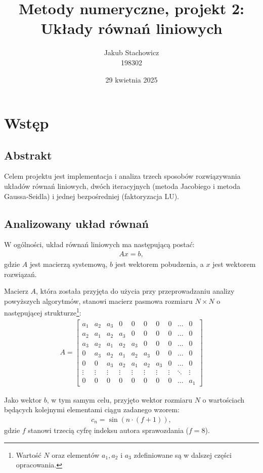 \documentclass{article}
\title{Metody numeryczne, projekt 2:\\Układy równań liniowych}
\author{Jakub Stachowicz\\198302}
\date{29 kwietnia 2025}
\begin{document}
\maketitle
\newpage
\tableofcontents
\newpage
\section{Wstęp}
\subsection{Abstrakt}
Celem projektu jest implementacja i analiza trzech sposobów rozwiązywania układów równań liniowych, dwóch iteracyjnych (metoda Jacobiego i metoda Gaussa-Seidla) i jednej bezpośredniej (faktoryzacja LU).

\subsection{Analizowany układ równań}

W ogólności, układ równań liniowych ma następującą postać:
\begin{align}
       Ax = b,
\end{align}
gdzie $A$ jest macierzą systemową, $b$ jest wektorem pobudzenia, a $x$ jest wektorem rozwiązań.

Macierz $A$, która została przyjęta do użycia przy przeprowadzaniu analizy powyższych algorytmów, stanowi macierz pasmowa rozmiaru $N \times N$ o następującej strukturze\footnote{Wartość $N$ oraz elementów $a_1, a_2$ i $a_3$ zdefiniowane są w dalszej części opracowania.}:
\begin{align}
A=
\begin{bmatrix} 
a_1 & a_2 & a_3 & 0 & 0 & 0 & 0 & 0 & \dots & 0 \\ 
a_2 & a_1 & a_2 & a_3 & 0 & 0 & 0 & 0 & \dots & 0 \\ 
a_3 & a_2 & a_1 & a_2 & a_3 & 0 & 0 & 0 & \dots & 0 \\ 
0 & a_3 & a_2 & a_1 & a_2 & a_3 & 0 & 0 & \dots & 0 \\
0 & 0 & a_3 & a_2 & a_1 & a_2 & a_3 & 0 & \dots & 0 \\
\vdots & \vdots & \vdots & \vdots & \vdots & \vdots & \vdots & \vdots & \ddots & \vdots \\
0 & 0 & 0 & 0 & 0 & 0 & 0 & 0 & \dots & a_1
\end{bmatrix}
\end{align}

Jako wektor $b$, w tym samym celu, przyjęto wektor rozmiaru $N$ o wartościach będących kolejnymi elementami ciągu zadanego wzorem:
\begin{align}
    c_n = \sin(n\cdot(f+1)),
\end{align}
gdzie $f$ stanowi trzecią cyfrę indeksu autora sprawozdania ($f = 8$).
\end{document}
